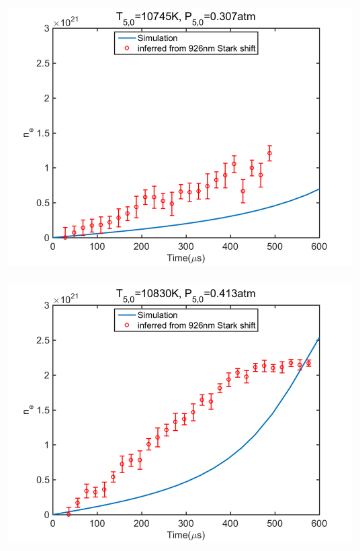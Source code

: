\documentclass[12pt]{iopart}
\begin{document}
\begin{figure}[h]
\begin{subfigure}[b]{0.4\textwidth}
     \includegraphics[width=\textwidth]{10745K_0307atm_ne_sim_926.png}
      \caption{\label{fig:} }
      \end{subfigure}
          \begin{subfigure}[b]{0.4\textwidth}
     \includegraphics[width=\textwidth]{10830K_0413atm_ne_sim_926.png}
      \caption{\label{fig:} }
      \end{subfigure}
          \begin{subfigure}[b]{0.4\textwidth}

\end{subfigure}
\end{figure}
\end{document}

